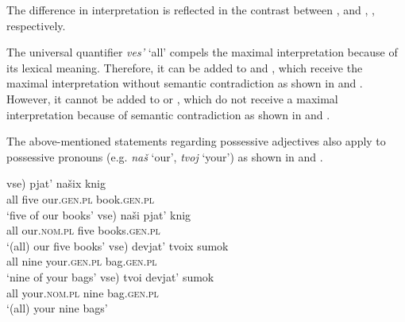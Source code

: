\documentclass[output=paper]{langscibook}
\begin{document}
The difference in interpretation is reflected in the contrast between ,  and , , respectively.

\ea\label{Num-PossALL}
\z\ex\label{Num-Poss2ALL}
\z\z

\noindent The universal quantifier \textit{ves'} `all' compels the maximal interpretation because of its lexical meaning. Therefore, it can be added to  and , which receive the maximal interpretation without semantic contradiction as shown in  and . However, it cannot be added to  or , which do not receive a maximal interpretation because of semantic contradiction as shown in  and .

The above-mentioned statements regarding possessive adjectives also apply to possessive pronouns (e.g. \textit{naš} `our', \textit{tvoj} `your') as shown in  and .

\ea\label{Num-Possprn}
\ea\label{NumPossprn}
\gll \minsp{(*} vse) pjat' našix knig\\
{} all five our.\textsc{gen.pl} book.\textsc{gen.pl}\\
\glt `five of our books'
\ex\label{PossprnNum}
\gll \minsp{(} vse) naši pjat' knig\\
{} all our.\textsc{nom.pl} five books.\textsc{gen.pl}\\
\glt `(all) our five books'
\z\ex\label{Num-Possprn2}
\ea\label{NumPossprn2}
\gll \minsp{(*} vse) devjat' tvoix sumok\\
{} all nine your.\textsc{gen.pl} bag.\textsc{gen.pl}\\
\glt `nine of your bags'
\ex\label{PossprnNum2}
\gll \minsp{(} vse) tvoi devjat' sumok\\
{} all your.\textsc{nom.pl} nine bag.\textsc{gen.pl}\\
\glt `(all) your nine bags'
\z\z
\end{document}
